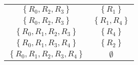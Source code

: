 \documentclass[12pt]{scrartcl}
\begin{document}
\begin{enumerate}
\begin{table}[H]
\begin{center}
\begin{tabular}{cc}
				$\left\lbrace R_{0}, R_{2}, R_{3} \right\rbrace $	& $\left\lbrace R_{1}\right\rbrace $ \\
				$\left\lbrace R_{0}, R_{2}, R_{3} \right\rbrace $	& $\left\lbrace R_{1}, R_{4}\right\rbrace $ \\
				$\left\lbrace R_{0}, R_{1}, R_{2}, R_{3} \right\rbrace $	& $\left\lbrace R_{4}\right\rbrace $ \\
				$\left\lbrace R_{0}, R_{1}, R_{3}, R_{4} \right\rbrace $	& $\left\lbrace R_{2}\right\rbrace $ \\
				$\left\lbrace R_{0}, R_{1}, R_{2}, R_{3}, R_{4} \right\rbrace $	& $\emptyset$ \\ \hline
			\end{tabular}
		\end{center}
	\end{table}
\end{enumerate}
\end{document}
